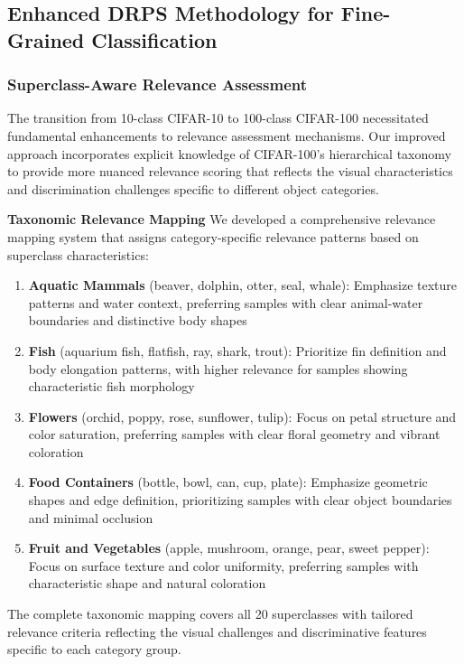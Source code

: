 \documentclass[12pt]{article}
\begin{document}
\subsection{Enhanced DRPS Methodology for Fine-Grained Classification}\label{methodology}

\subsubsection{Superclass-Aware Relevance Assessment}\label{superclass-relevance}

The transition from 10-class CIFAR-10 to 100-class CIFAR-100 necessitated fundamental enhancements to relevance assessment mechanisms. Our improved approach incorporates explicit knowledge of CIFAR-100's hierarchical taxonomy to provide more nuanced relevance scoring that reflects the visual characteristics and discrimination challenges specific to different object categories.

\textbf{Taxonomic Relevance Mapping}
We developed a comprehensive relevance mapping system that assigns category-specific relevance patterns based on superclass characteristics:

\begin{enumerate}
\item \textbf{Aquatic Mammals} (beaver, dolphin, otter, seal, whale): Emphasize texture patterns and water context, preferring samples with clear animal-water boundaries and distinctive body shapes
\item \textbf{Fish} (aquarium fish, flatfish, ray, shark, trout): Prioritize fin definition and body elongation patterns, with higher relevance for samples showing characteristic fish morphology
\item \textbf{Flowers} (orchid, poppy, rose, sunflower, tulip): Focus on petal structure and color saturation, preferring samples with clear floral geometry and vibrant coloration
\item \textbf{Food Containers} (bottle, bowl, can, cup, plate): Emphasize geometric shapes and edge definition, prioritizing samples with clear object boundaries and minimal occlusion
\item \textbf{Fruit and Vegetables} (apple, mushroom, orange, pear, sweet pepper): Focus on surface texture and color uniformity, preferring samples with characteristic shape and natural coloration
\end{enumerate}

The complete taxonomic mapping covers all 20 superclasses with tailored relevance criteria reflecting the visual challenges and discriminative features specific to each category group.
\end{document}

